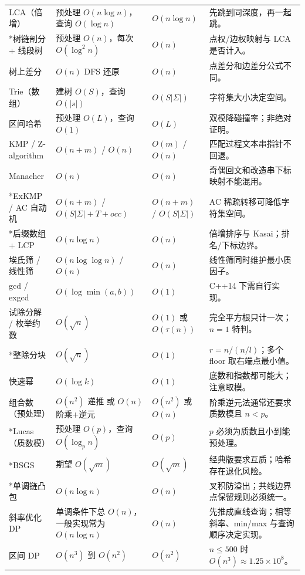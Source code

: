 \documentclass[a4paper,11pt]{article}
\begin{document}
\begin{longtable}{L{3cm} L{2.8cm} L{2.4cm} L{8cm}}
LCA（倍增） & 预处理 $O(n\log n)$，查询 $O(\log n)$ & $O(n\log n)$ & 先跳到同深度，再一起跳。\\[2mm]
*树链剖分 + 线段树 & 预处理 $O(n)$，每次 $O(\log^2 n)$ & $O(n)$ & 点权/边权映射与 LCA 是否计入。\\[2mm]
树上差分 & $O(n)$ DFS 还原 & $O(n)$ & 点差分和边差分公式不同。\\[2mm]
Trie（数组） & 建树 $O(S)$，查询 $O(|s|)$ & $O(S|\Sigma|)$ & 字符集大小决定空间。\\[2mm]
区间哈希 & 预处理 $O(L)$，查询 $O(1)$ & $O(L)$ & 双模降碰撞率；非绝对证明。\\[2mm]
KMP / Z-algorithm & $O(n+m)$ / $O(n)$ & $O(m)$ / $O(n)$ & 匹配过程文本串指针不回退。\\[2mm]
Manacher & $O(n)$ & $O(n)$ & 奇偶回文和改造串下标映射不能混用。\\[2mm]
*ExKMP / AC 自动机 & $O(n+m)$ / $O(S|\Sigma|+T+occ)$ & $O(n+m)$ / $O(S|\Sigma|)$ & AC 稀疏转移可降低字符集空间。\\[2mm]
*后缀数组 + LCP & $O(n\log n)$ & $O(n)$ & 倍增排序与 Kasai；排名/下标边界。\\[2mm]
埃氏筛 / 线性筛 & $O(n\log\log n)$ / $O(n)$ & $O(n)$ & 线性筛同时维护最小质因子。\\[2mm]
gcd / exgcd & $O(\log\min(a,b))$ & $O(1)$ & C++14 下需自行实现。\\[2mm]
试除分解 / 枚举约数 & $O(\sqrt n)$ & $O(1)$ 或 $O(\tau(n))$ & 完全平方根只计一次；$n=1$ 特判。\\[2mm]
*整除分块 & $O(\sqrt n)$ & $O(1)$ & $r=n/(n/l)$；多个 floor 取右端点最小值。\\[2mm]
快速幂 & $O(\log k)$ & $O(1)$ & 底数和指数都可能大；注意取模。\\[2mm]
组合数（预处理） & $O(n^2)$ 递推 或 $O(n)$ 阶乘+逆元 & $O(n^2)$ 或 $O(n)$ & 阶乘逆元法通常还要求质数模且 $n<p$。\\[2mm]
*Lucas（质数模） & 预处理 $O(p)$，查询 $O(\log_p n)$ & $O(p)$ & $p$ 必须为质数且小到能预处理。\\[2mm]
*BSGS & 期望 $O(\sqrt m)$ & $O(\sqrt m)$ & 经典版要求互质；哈希存在退化风险。\\[2mm]
*单调链凸包 & $O(n\log n)$ & $O(n)$ & 叉积防溢出；共线边界点保留规则必须统一。\\[2mm]
斜率优化 DP & 单调条件下总 $O(n)$，一般实现常为 $O(n\log n)$ & $O(n)$ & 先推成直线查询；相等斜率、min/max 与查询顺序决定实现。\\[2mm]
区间 DP & $O(n^3)$ 到 $O(n^2)$ & $O(n^2)$ & $n\le500$ 时 $O(n^3)\approx1.25\times10^8$。\\[2mm]

\end{longtable}
\end{document}
